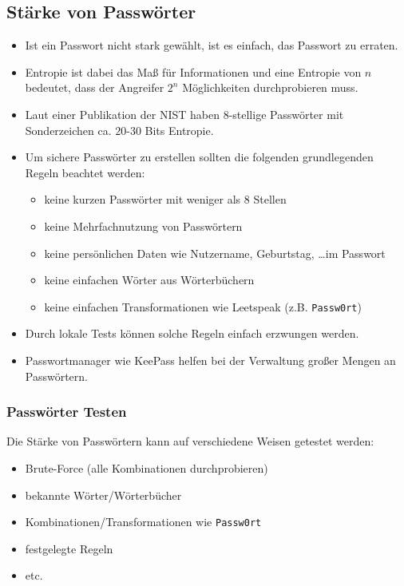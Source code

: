 		\subsection{Stärke von Passwörter}
			\begin{itemize}
				\item Ist ein Passwort nicht stark gewählt, ist es einfach, das Passwort zu erraten.
				\item Entropie ist dabei das Maß für Informationen und eine Entropie von \(n\) bedeutet, dass der Angreifer \(2^n\) Möglichkeiten durchprobieren muss.
				\item Laut einer Publikation der NIST haben 8-stellige Passwörter mit Sonderzeichen ca. \(20\)-\(30\) Bits Entropie.
				\item Um sichere Passwörter zu erstellen sollten die folgenden grundlegenden Regeln beachtet werden:
					\begin{itemize}
						\item keine kurzen Passwörter mit weniger als 8 Stellen
						\item keine Mehrfachnutzung von Passwörtern
						\item keine persönlichen Daten wie Nutzername, Geburtstag, \dots im Passwort
						\item keine einfachen Wörter aus Wörterbüchern
						\item keine einfachen Transformationen wie Leetspeak (z.B. \texttt{Passw0rt})
					\end{itemize}
				\item Durch lokale Tests können solche Regeln einfach erzwungen werden.
				\item Passwortmanager wie KeePass helfen bei der Verwaltung großer Mengen an Passwörtern.
			\end{itemize}

			\subsubsection{Passwörter Testen}
				Die Stärke von Passwörtern kann auf verschiedene Weisen getestet werden:
				\begin{itemize}
					\item Brute-Force (alle Kombinationen durchprobieren)
					\item bekannte Wörter/Wörterbücher
					\item Kombinationen/Transformationen wie \texttt{Passw0rt}
					\item festgelegte Regeln
					\item etc.
				\end{itemize}

